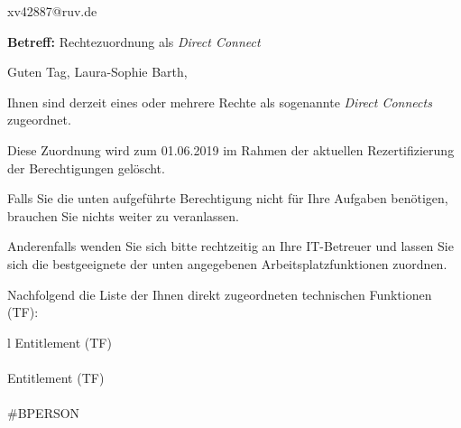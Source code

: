 \documentclass[a4paper,landscape,12pt]{letter}
\begin{document}
\begin{letter}{xv42887@ruv.de\hfill \break}
\begin{normalsize}
	\opening{\textbf{Betreff:} Rechtezuordnung als \emph{Direct Connect}}
	\begin{normalsize} \hfill
	\end{normalsize}

	\begin{normalsize}
		Guten Tag, 
	Laura-Sophie Barth, \hfill \break
	\end{normalsize}
	\end{normalsize}
	
\begin{normalsize}
	Ihnen sind derzeit eines oder mehrere Rechte als sogenannte \emph{Direct Connects} zugeordnet.
	
	Diese Zuordnung wird zum 01.06.2019 im Rahmen der aktuellen Rezertifizierung der Berechtigungen gelöscht.
	
	Falls Sie die unten aufgeführte Berechtigung nicht für Ihre Aufgaben benötigen, 
	brauchen Sie nichts weiter zu veranlassen.
	
	Anderenfalls wenden Sie sich bitte rechtzeitig an Ihre IT-Betreuer 
	und lassen Sie sich die bestgeeignete der unten angegebenen Arbeitsplatzfunktionen zuordnen.
	\end{normalsize}
	
\begin{normalsize}
	Nachfolgend die Liste der Ihnen direkt zugeordneten technischen Funktionen (TF):

	\begin{longtable}{l}
		Entitlement (TF) \\ \hline
		\endfirsthead
		\\\hline
		Entitlement (TF) \\ \hline
		\endhead %
		\multicolumn{1}{r@{}}{Fortsetzung \ldots}\\
		\endfoot
		\hline
		\endlastfoot
	\#BPERSON\\
	\end{longtable}
	\end{normalsize}
	

\end{letter}
\end{document}
